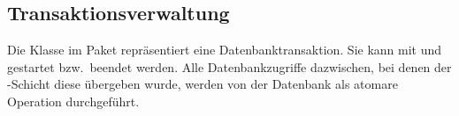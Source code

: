 \subsection{Transaktionsverwaltung}\label{subsec:transactions}
Die Klasse  im Paket  repräsentiert eine Datenbanktransaktion.
Sie kann mit  und  gestartet bzw.\ beendet werden.
Alle Datenbankzugriffe dazwischen, bei denen der -Schicht diese  übergeben wurde, werden von der Datenbank als atomare Operation durchgeführt.